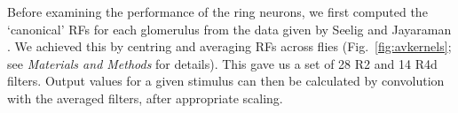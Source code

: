\begin{comment}
\texthl{[AP Notes: we then need to go onto the next part which will either be in this section or  the subsequent one. Either way, current version needs re-ordering I think. I've had a little go: ]}

"A different way is to look at the difference in the information in the outputs in a visual task such as pattern discrim. Or: This approach also allows us to compare behaviorual data 
with different proposed models.

The standard paradigm for testing pattern discrimination in \emph{Drosophila} \cite{Pan2009,Liu2006,Ernst1999,Dill1993}, involves tethering a fly in a drum with alternating patterns on the inside (Fig.~\ref{fig:recap}A).
When the fly attempts to rotate about the yaw-axis, the pattern on the drum is rotated by a corresponding amount in the opposite direction, giving closed-loop control.
Conditioning is aversive: Fixation upon certain portions of one of the patterns is punished with heat from a laser.
Hence, if the fly can discriminate the patterns, it will orient towards the non-punished pattern. 

To recreate the visual information perceived by flies in such experiments, we simulated a typical experimental flight arena with a fly tethered in the centre. We then examined the output of R2 etc 
cells as we simulate the fly rotating. Can see the output in fig x to 2 different patterns, where output has been summed [explain output and what is in fig]. 
While we don't know  how it is further processed we can for instance look at the simple difference between the outputs to the patterns ... [explain the logic we have so we can set up our retinotopic
difference meausres ie] we look at 0 and 90 and look at the difference of inputs processed in different ways to examine proposed models"
\end{comment}

Before examining the performance of the ring neurons, we first computed the `canonical' RFs for each glomerulus from the data given by Seelig and Jayaraman \cite{Seelig2013}.
We achieved this by centring and averaging RFs across flies (Fig.~\ref{fig:avkernels}; see \emph{Materials and Methods} for details).
This gave us a set of 28 R2 and 14 R4d filters.
Output values for a given stimulus can then be calculated by convolution with the averaged filters, after appropriate scaling.


